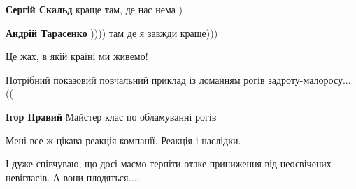 \begin{itemize}
\begin{itemize}
 
\textbf{Сергій Скальд} краще там, де нас нема )

 
\textbf{Андрій Тарасенко} )))) там де я завжди краще)))
\end{itemize}

 
Це жах, в якій країні ми живемо!

 
Потрібний показовий повчальний приклад із ломанням рогів задроту-малоросу...((👹

\begin{itemize}
 
\textbf{Ігор Правий} Майстер клас по обламуванні рогів
\end{itemize}

 
Мені все ж цікава реакція компанії. Реакція і наслідки.

І дуже співчуваю, що досі маємо терпіти отаке приниження від неосвічених невігласів. А вони плодяться....



\end{itemize}
